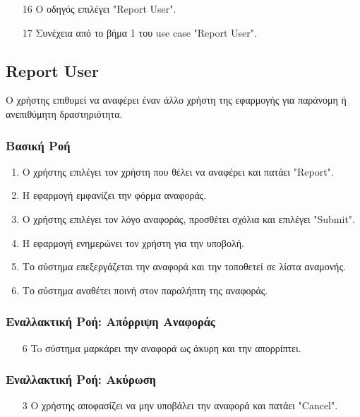 \begin{enumerate}
    \item[16] Ο οδηγός επιλέγει "Report User".
    \item[17] Συνέχεια από το βήμα 1 του use case "Report User".
\end{enumerate}


\subsection{Report User}
\label{uc:report-user}

Ο χρήστης επιθυμεί να αναφέρει έναν άλλο χρήστη της εφαρμογής για
παράνομη ή ανεπιθύμητη δραστηριότητα.

\subsubsection{Βασική Ροή}

\begin{enumerate}
    \item Ο χρήστης επιλέγει τον χρήστη που θέλει να αναφέρει και πατάει "Report".
    \item H εφαρμογή εμφανίζει την φόρμα αναφοράς.
    \item Ο χρήστης επιλέγει τον λόγο αναφοράς, προσθέτει σχόλια και επιλέγει "Submit".
    \item Η εφαρμογή ενημερώνει τον χρήστη για την υποβολή.
    \item Το σύστημα επεξεργάζεται την αναφορά και την τοποθετεί σε λίστα αναμονής.
    \item Το σύστημα αναθέτει ποινή στον παραλήπτη της αναφοράς.
\end{enumerate}

\subsubsection{Εναλλακτική Ροή: Απόρριψη Αναφοράς}

\begin{enumerate}
    \item[6] To σύστημα μαρκάρει την αναφορά ως άκυρη και την απορρίπτει.
\end{enumerate}

\subsubsection{Εναλλακτική Ροή: Ακύρωση}

\begin{enumerate}
    \item[3] Ο χρήστης αποφασίζει να μην υποβάλει την αναφορά και πατάει "Cancel".
\end{enumerate}

\newpage


\newpage



